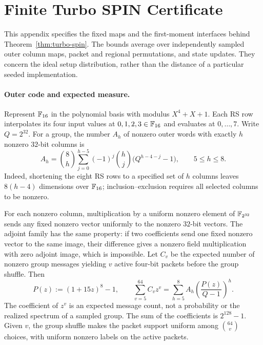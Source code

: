 \section{Finite Turbo SPIN Certificate}
\label{app:turbo-proof}

This appendix specifies the fixed maps and the first-moment interfaces
behind Theorem~\ref{thm:turbo-spin}. The bounds average over independently
sampled outer column maps, packet and regional permutations, and state
updates. They concern the ideal setup distribution, rather than the
distance of a particular seeded implementation.

\paragraph{Outer code and expected measure.}
Represent $\mathbb F_{16}$ in the polynomial basis with modulus
$X^4+X+1$. Each RS row interpolates its four input values at
$0,1,2,3\in\mathbb F_{16}$ and evaluates at $0,\ldots,7$.
Write $Q=2^{32}$. For a group, the number $A_h$ of nonzero outer words
with exactly $h$ nonzero $32$-bit columns is
\begin{equation}
 A_h=\binom8h\sum_{j=0}^{h-5}(-1)^j\binom hj
       \bigl(Q^{h-4-j}-1\bigr),\qquad 5\le h\le8.
 \label{eq:turbo-column-spectrum}
\end{equation}
Indeed, shortening the eight RS rows to a specified set of $h$ columns
leaves $8(h-4)$ dimensions over $\mathbb F_{16}$; inclusion--exclusion requires
all selected columns to be nonzero.

For each nonzero column, multiplication by a uniform nonzero element of
$\mathbb F_{2^{32}}$ sends any fixed nonzero vector uniformly to the nonzero
$32$-bit vectors. The adjoint family has the same property: if two
coefficients send one fixed nonzero vector to the same image, their
difference gives a nonzero field multiplication with zero adjoint image,
which is impossible. Let $C_v$ be the expected number of nonzero group
messages yielding $v$ active four-bit packets before the group shuffle.
Then
\begin{equation}
  P(z):=(1+15z)^8-1,\qquad
  \sum_{v=5}^{64}C_vz^v
   =\sum_{h=5}^{8}A_h\left(\frac{P(z)}{Q-1}\right)^h.
  \label{eq:turbo-packet-spectrum}
\end{equation}
The coefficient of $z^v$ is an expected message count, not a probability
or the realized spectrum of a sampled group. The sum of the coefficients
is $2^{128}-1$. Given $v$, the group shuffle makes the packet support
uniform among $\binom{64}{v}$ choices, with uniform nonzero labels on the
active packets.

